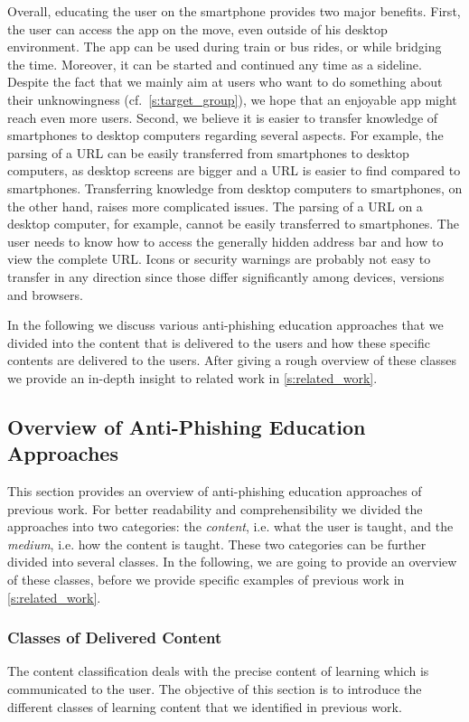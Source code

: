 Overall, educating the user on the smartphone provides two major benefits.
First, the user can access the app on the move, even outside of his desktop environment.
The app can be used during train or bus rides, or while bridging the time.
Moreover, it can be started and continued any time as a sideline.
Despite the fact that we mainly aim at users who want to do something about their unknowingness (cf.~\autoref{s:target_group}), we hope that an enjoyable app might reach even more users.
Second, we believe it is easier to transfer knowledge of smartphones to desktop computers regarding several aspects.
For example, the parsing of a URL can be easily transferred from smartphones to desktop computers, as desktop screens are bigger and a URL is easier to find compared to smartphones.
Transferring knowledge from desktop computers to smartphones, on the other hand, raises more complicated issues.
The parsing of a URL on a desktop computer, for example, cannot be easily transferred to smartphones.
The user needs to know how to access the generally hidden address bar and how to view the complete URL.
Icons or security warnings are probably not easy to transfer in any direction since those differ significantly among devices, versions and browsers.

In the following we discuss various anti-phishing education approaches that we divided into the content that is delivered to the users and how these specific contents are delivered to the users.
After giving a rough overview of these classes we provide an in-depth insight to related work in \autoref{s:related_work}.

\subsection{Overview of Anti-Phishing Education Approaches}
This section provides an overview of anti-phishing education approaches of previous work.
 For better readability and comprehensibility we divided the approaches into two categories: the \textit{content}, i.e.
 what the user is taught, and the 
\textit{medium}, i.e. how the content is taught.
These two categories can be further divided into several classes. 
In the following, we are going to provide an overview of these classes, before we provide specific examples of previous work in \autoref{s:related_work}.

\subsubsection{Classes of Delivered Content}
\label{s:content_classification}
The content classification deals with the precise content of learning which is communicated to the user. 
The objective of this section is to introduce the different classes of learning content that we identified in previous work.

